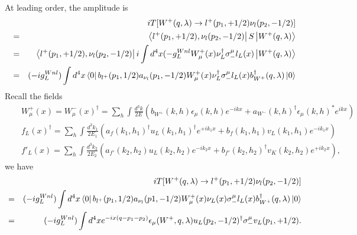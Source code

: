 \documentclass[11pt]{article}
\def\dgr{\dagger}
\def\eps{\epsilon}
\def\lmd{\lambda}
\begin{document}
\section{ }
At leading order, the amplitude is
\begin{eqnarray}
    &&iT[W^+(q,\lambda) \to l^+(p_1,+1/2) \nu_l(p_2,-1/2)] \nonumber \\ 
    &=&\bra{l^+(p_1,+1/2),\nu_l(p_2,-1/2)} S\ket{W^+(q,\lambda)} \\
    &=&\bra{l^+(p_1,+1/2),\nu_l(p_2,-1/2)} i\int d^4x
    (-g_L^{Wnl} W^+_\mu(x) \nu_L^\dagger \sigma_-^\mu l_L(x) \ket{W^+(q,\lambda)} \\
    &=&(-ig_L^{Wnl}) \int d^4x \bra{0}b_{l^+}(p_1,1/2) a_{\nu_l}(p_1,-1/2)
    W^+_\mu(x) \nu_L^\dagger \sigma_-^\mu l_L(x) b^\dagger_{W^+}(q,\lambda) \ket{0}
\end{eqnarray}
Recall the fields
\begin{eqnarray}
&&W^+_\mu(x) = W^-_\mu(x)^\dgr
= \sum_h \int \frac{d^3k}{2E}
( b_{W^+}(k,h)         \epsilon_\mu(k,h)   e^{-ikx}
+ a_{W^-}(k,h)^\dagger \epsilon_\mu(k,h)^* e^{ikx}) \\
&&f_L(x)^\dgr
= \sum_h \int \frac{d^3k_1}{2E_1}
( a_f(k_1,h_1)^\dgr u_L(k_1,h_1)^\dgr e^{+ik_1x}
+ b_f(k_1,h_1)      v_L(k_1,h_1)      e^{-ik_1x} ) \\ 
&&f'_L(x) = \sum_h \int \frac{d^3k_2}{2E_2}
( a_{f'}(k_2,h_2)    u_L(k_2,h_2) e^{-ik_2x}
+ b_{f'}(k_2,h_2)^\dgr v_K(k_2,h_2) e^{+ik_2x} ),
\end{eqnarray}
we have
\begin{eqnarray}
    &&   iT[W^+(q,\lmd) \to l^+(p_1,+1/2) \nu_l(p_2,-1/2)] \nonumber \\
   &=& (-ig_L^{Wnl}) \int d^4x
   \bra{0} b_{l^+}(p_1,1/2) a_{\nu_l}(p1,-1/2)
       W^+_\mu(x) \nu_L(x) \sigma_-^\mu l_L(x)
                                   b^\dagger_{W^+}(q,\lmd) \ket{0}\\ 
   &=& (-ig_L^{Wnl}) \int d^4x e^{-ix(q-p_1-p_2)}
   \eps_\mu(W^+,q,\lmd) u_L(p_2,-1/2)^\dgr \sigma_-^\mu v_L(p_1,+1/2).
\end{eqnarray}
\end{document}
